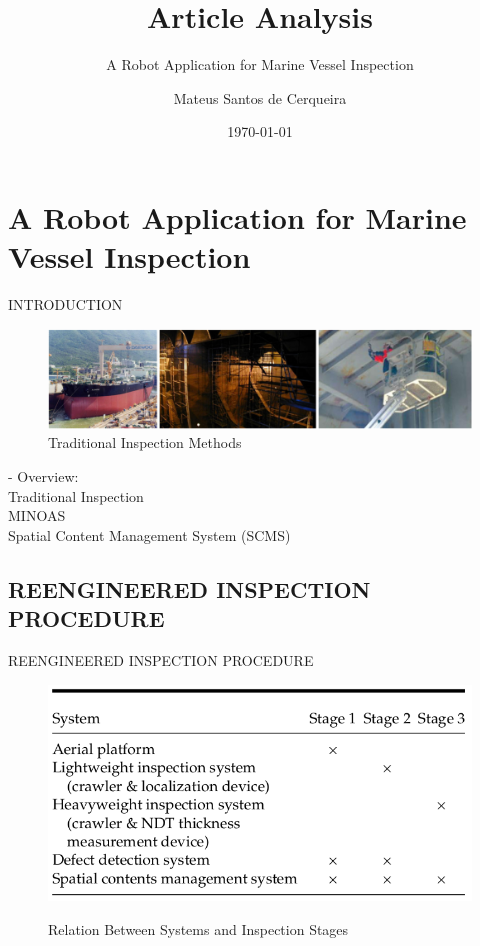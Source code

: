 \documentclass{beamer}
\title{Article Analysis}
\subtitle{A Robot Application for Marine Vessel Inspection}
\author{Mateus Santos de Cerqueira}
\institute{SENAI}
\date{\today}
\begin{document}
    \begin{frame}
        \titlepage
    \end{frame}
    
    \section{A Robot Application for Marine Vessel Inspection}
      
            \begin{frame}{INTRODUCTION}
                \begin{figure}[htb]
                    \centering
                    \includegraphics[scale=0.16]{figuras/traditional_inspection.png}                   
                    \caption{Traditional Inspection Methods}
                    \label{}                    
                \end{figure}
                    - Overview: \\
                    Traditional Inspection \\
                    MINOAS \\
                    Spatial Content Management System (SCMS)                
                           
            \end{frame}
            
        \subsection{REENGINEERED INSPECTION PROCEDURE}

            \begin{frame}{REENGINEERED INSPECTION PROCEDURE}
                \begin{figure}[htb]
                    \centering
                    \includegraphics[scale=0.35]{figuras/inspection_stages}                   
                    \label{}
                    \caption{Relation Between Systems and Inspection Stages}
                \end{figure}


            \end{frame}
\end{document}
